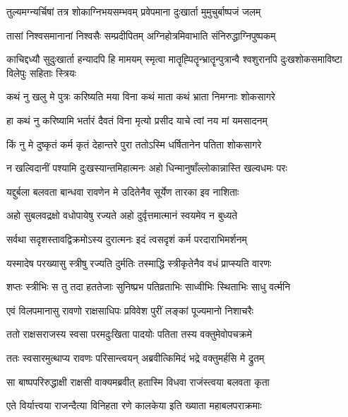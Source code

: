 \twolineshloka
{तुल्यमग्न्यर्चिषां तत्र शोकाग्निभयसम्भवम्}
{प्रवेपमाना दुःखार्ता मुमुचुर्बाष्पजं जलम्} %

\twolineshloka
{तासां निश्वसमानानां निश्वसैः सम्प्रदीपितम्}
{अग्निहोत्रमिवाभाति संनिरुद्धाग्निपुष्पकम्} %

\threelineshloka
{काचिद्दध्यौ सुदुःखार्ता हन्यादपि हि मामयम्}
{स्मृत्वा मातॄह्पितॄन्भ्रातॄन्पुत्रान्वै श्वशुरानपि}
{दुःखशोकसमाविष्टा विलेपुः सहिताः स्त्रियः} %

\twolineshloka
{कथं नु खलु मे पुत्रः करिष्यति मया विना}
{कथं माता कथं भ्राता निमग्नाः शोकसागरे} %

\twolineshloka
{हा कथं नु करिष्यामि भर्तारं दैवतं विना}
{मृत्यो प्रसीद याचे त्वां नय मां यमसादनम्} %

\twolineshloka
{किं नु मे दुष्कृतं कर्म कृतं देहान्तरे पुरा}
{ततोऽस्मि धर्षितानेन पतिता शोकसागरे} %

\twolineshloka
{न खल्विदानीं पश्यामि दुःखस्यान्तमिहात्मनः}
{अहो धिन्मानुषाँल्लोकान्नास्ति खल्वधमः परः} %

\twolineshloka
{यद्दुर्बला बलवता बान्धवा रावणेन मे}
{उदितेनैव सूर्येण तारका इव नाशिताः} %

\twolineshloka
{अहो सुबलवद्रक्षो वधोपायेषु रज्यते}
{अहो दुर्वृत्तमात्मानं स्वयमेव न बुध्यते} %

\twolineshloka
{सर्वथा सदृशस्तावद्विक्रमोऽस्य दुरात्मनः}
{इदं त्वसदृशं कर्म परदाराभिमर्शनम्} %

\twolineshloka
{यस्मादेष परख्यासु स्त्रीषु रज्यति दुर्मतिः}
{तस्माद्धि स्त्रीकृतेनैव वधं प्राप्स्यति वारणः} %

\twolineshloka
{शप्तः स्त्रीभिः स तु तदा हततेजाः सुनिष्प्रभ}
{पतिव्रताभिः साध्वीभिः स्थिताभिः साधु वर्त्मनि} %

\twolineshloka
{एवं विलपमानासु रावणो राक्षसाधिपः}
{प्रविवेश पुरीं लङ्कां पूज्यमानो निशाचरैः} %

\twolineshloka
{ततो राक्षसराजस्य स्वसा परमदुःखिता}
{पादयोः पतिता तस्य वक्तुमेवोपचक्रमे} %

\twolineshloka
{ततः स्वसारमुत्थाप्य रावणः परिसान्त्वयन्}
{अब्रवीत्किमिदं भद्रे वक्तुमर्हसि मे द्रुतम्} %

\twolineshloka
{सा बाष्पपरिरुद्धाक्षी राक्षसी वाक्यमब्रवीत्}
{हतास्मि विधवा राजंस्त्वया बलवता कृता} %

\twolineshloka
{एते विर्यात्त्वया राजन्दैत्या विनिहता रणे}
{कालकेया इति ख्याता महाबलपराक्रमाः} %

